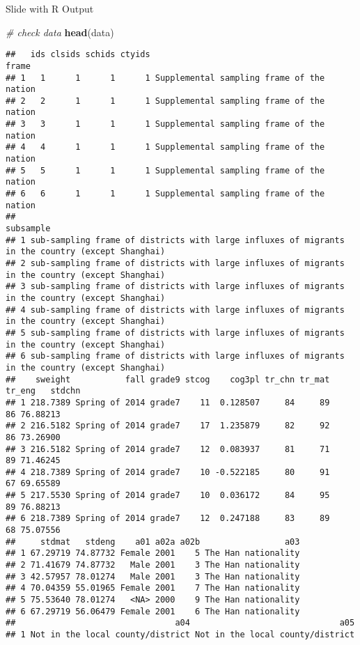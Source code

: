 \documentclass[
  ignorenonframetext,
]{beamer}
\newenvironment{Shaded}{\begin{snugshade}}{\end{snugshade}}
\newcommand{\CommentTok}[1]{\textcolor[rgb]{0.56,0.35,0.01}{\textit{#1}}}
\newcommand{\FunctionTok}[1]{\textcolor[rgb]{0.13,0.29,0.53}{\textbf{#1}}}
\newcommand{\NormalTok}[1]{#1}
\begin{document}
\begin{frame}[fragile]{Slide with R Output}
\begin{Shaded}
\begin{Highlighting}[]
\CommentTok{\# check data}
\FunctionTok{head}\NormalTok{(data)}
\end{Highlighting}
\end{Shaded}

\begin{verbatim}
##   ids clsids schids ctyids                                     frame
## 1   1      1      1      1 Supplemental sampling frame of the nation
## 2   2      1      1      1 Supplemental sampling frame of the nation
## 3   3      1      1      1 Supplemental sampling frame of the nation
## 4   4      1      1      1 Supplemental sampling frame of the nation
## 5   5      1      1      1 Supplemental sampling frame of the nation
## 6   6      1      1      1 Supplemental sampling frame of the nation
##                                                                                          subsample
## 1 sub-sampling frame of districts with large influxes of migrants in the country (except Shanghai)
## 2 sub-sampling frame of districts with large influxes of migrants in the country (except Shanghai)
## 3 sub-sampling frame of districts with large influxes of migrants in the country (except Shanghai)
## 4 sub-sampling frame of districts with large influxes of migrants in the country (except Shanghai)
## 5 sub-sampling frame of districts with large influxes of migrants in the country (except Shanghai)
## 6 sub-sampling frame of districts with large influxes of migrants in the country (except Shanghai)
##    sweight           fall grade9 stcog    cog3pl tr_chn tr_mat tr_eng   stdchn
## 1 218.7389 Spring of 2014 grade7    11  0.128507     84     89     86 76.88213
## 2 216.5182 Spring of 2014 grade7    17  1.235879     82     92     86 73.26900
## 3 216.5182 Spring of 2014 grade7    12  0.083937     81     71     89 71.46245
## 4 218.7389 Spring of 2014 grade7    10 -0.522185     80     91     67 69.65589
## 5 217.5530 Spring of 2014 grade7    10  0.036172     84     95     89 76.88213
## 6 218.7389 Spring of 2014 grade7    12  0.247188     83     89     68 75.07556
##     stdmat   stdeng    a01 a02a a02b                 a03
## 1 67.29719 74.87732 Female 2001    5 The Han nationality
## 2 71.41679 74.87732   Male 2001    3 The Han nationality
## 3 42.57957 78.01274   Male 2001    3 The Han nationality
## 4 70.04359 55.01965 Female 2001    7 The Han nationality
## 5 75.53640 78.01274   <NA> 2000    9 The Han nationality
## 6 67.29719 56.06479 Female 2001    6 The Han nationality
##                                a04                              a05
## 1 Not in the local county/district Not in the local county/district

\end{verbatim}
\end{frame}
\end{document}
